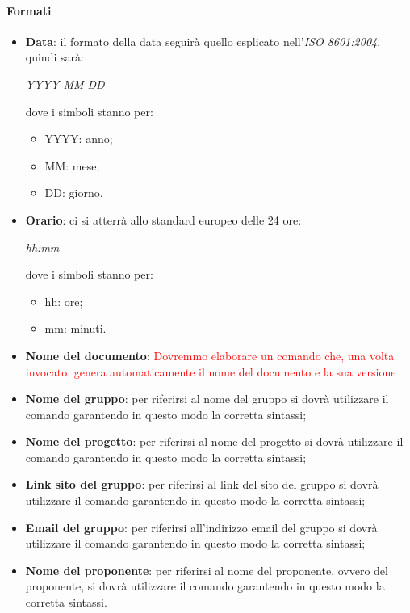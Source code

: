 	\paragraph{Formati}
	\begin{itemize}
		\item \textbf{Data}: il formato della data seguirà quello esplicato nell'\emph{ISO 8601:2004}, quindi sarà: 
		\begin{center}
			\emph{YYYY-MM-DD}
		\end{center}
		dove i simboli stanno per:
		\begin{itemize}
			\item YYYY: anno;
			\item MM: mese;
			\item DD: giorno.
		\end{itemize}
		\item \textbf{Orario}: ci si atterrà allo standard europeo delle 24 ore:
		 \begin{center}
		 	\emph{hh:mm}
		 \end{center}
	 	dove i simboli stanno per:
	 	\begin{itemize}
	 		\item hh: ore;
	 		\item mm: minuti.
	 	\end{itemize}
		\item \textbf{Nome del documento}: \textcolor{red}{Dovremmo elaborare un comando che, una volta invocato, genera automaticamente il nome del documento e la sua versione}
		\item \textbf{Nome del gruppo}: per riferirsi al nome del gruppo si dovrà
		utilizzare il comando garantendo in questo modo la corretta sintassi;
		\item \textbf{Nome del progetto}: per riferirsi al nome del progetto si dovrà
		utilizzare il comando garantendo in questo modo la corretta sintassi;
		\item \textbf{Link sito del gruppo}: per riferirsi al link del sito del gruppo si dovrà
		utilizzare il comando garantendo in questo modo la corretta sintassi;
		\item \textbf{Email del gruppo}: per riferirsi all'indirizzo email del gruppo si dovrà
		utilizzare il comando garantendo in questo modo la corretta sintassi;
		\item \textbf{Nome del proponente}: per riferirsi al nome del proponente, ovvero del proponente, si dovrà
		utilizzare il comando garantendo in questo modo la corretta
		sintassi.
	\end{itemize}
